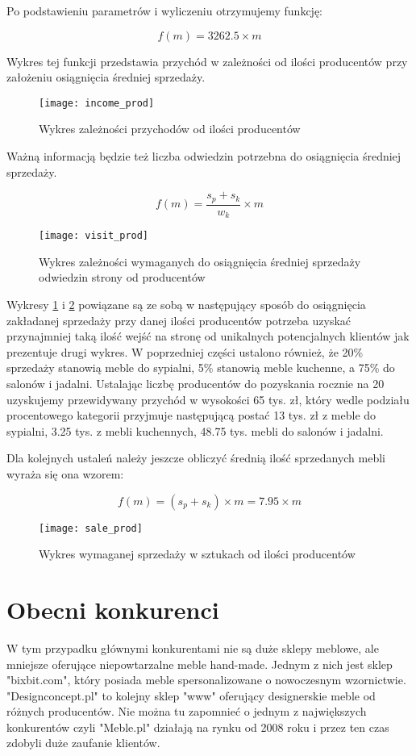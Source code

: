 		Po podstawieniu parametrów i wyliczeniu otrzymujemy funkcję:
		
		\[	f(m) = 3262.5 \times m \]

		Wykres tej funkcji przedstawia przychód w zależności od ilości producentów przy założeniu osiągnięcia średniej sprzedaży.
		
		\begin{figure}
			\centering
			\texttt{[image: income\_prod]}
			\caption{Wykres zależności przychodów od ilości producentów}
			\label{income_prod}
		\end{figure}

		Ważną informacją będzie też liczba odwiedzin potrzebna do osiągnięcia średniej sprzedaży. 
		
		\[ f(m) = \dfrac{ s_p + s_k }{w_k} \times m \] %
		
		\begin{figure}
			\centering
			\texttt{[image: visit\_prod]}
			\caption{Wykres zależności wymaganych do osiągnięcia średniej sprzedaży odwiedzin strony od producentów}
			\label{visit_prod}
		\end{figure}
		
		Wykresy \ref{income_prod} i \ref{visit_prod} powiązane są ze sobą w następujący sposób do osiągnięcia zakładanej sprzedaży przy danej ilości producentów potrzeba uzyskać przynajmniej taką ilość wejść na stronę od unikalnych potencjalnych klientów jak prezentuje drugi wykres.
		W poprzedniej części ustalono również, że 20\% sprzedaży stanowią meble do sypialni, 5\% stanowią meble kuchenne, a 75\% do salonów i jadalni.
		Ustalając liczbę producentów do pozyskania rocznie na 20 uzyskujemy przewidywany przychód w wysokości 65 tys. zł, który wedle podziału procentowego kategorii przyjmuje następującą postać 13 tys. zł z meble do sypialni, 3.25 tys. z mebli kuchennych, 48.75 tys. mebli do salonów i jadalni.  
		
		Dla kolejnych ustaleń należy jeszcze obliczyć średnią ilość sprzedanych mebli wyraża się ona wzorem:
		
		\[ f(m) = ( s_p + s_k ) \times m = 7.95 \times m \]
		
		\begin{figure}
			\centering
			\texttt{[image: sale\_prod]}
			\caption{Wykres wymaganej sprzedaży w sztukach od ilości producentów}
			\label{sale_prod}
		\end{figure}

		
	\section{Obecni konkurenci}
		\par W tym przypadku głównymi konkurentami nie są  duże sklepy meblowe, ale mniejsze oferujące niepowtarzalne meble hand-made. Jednym z nich jest sklep "bixbit.com", który posiada meble spersonalizowane o nowoczesnym wzornictwie. "Designconcept.pl" to kolejny sklep "www" oferujący  designerskie meble od różnych producentów. Nie można tu zapomnieć o jednym z największych konkurentów czyli "Meble.pl" działają na rynku od 2008 roku i przez ten czas zdobyli duże zaufanie klientów.
	
